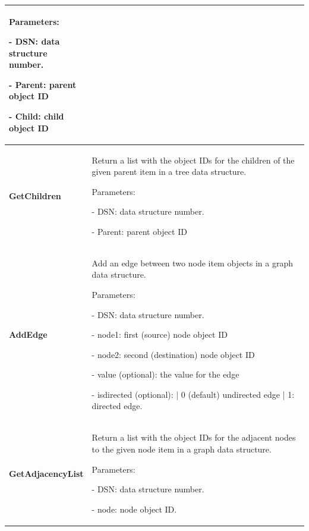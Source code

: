 \begin{longtable}
\begin{tabular}{|p{0.25\linewidth}|p{0.75\linewidth}|}
Parameters:

- DSN: data structure number.

- Parent: parent object ID

- Child: child object ID
\\
\hline
    \textbf{GetChildren} & Return a list with the object IDs for the children of the given parent item in a tree data structure.
    
Parameters:

- DSN: data structure number.

- Parent: parent object ID
\\
\hline
    \textbf{AddEdge} & Add an edge between two node item objects in a graph data structure.
    
Parameters:

- DSN: data structure number.

- node1:  first (source) node object ID

- node2:  second (destination) node object ID

- value (optional):  the value for the edge

- is\textunderscore directed (optional): | 0 (default) undirected edge | 1: directed edge. 
\\
\hline
    \textbf{GetAdjacencyList} & Return a list with the object IDs for the adjacent nodes to the given node item in a graph data structure.
    
Parameters:

- DSN: data structure number.

- node: node object ID.
\\
        \hline
    \end{tabular}
\end{longtable}       



\newpage
